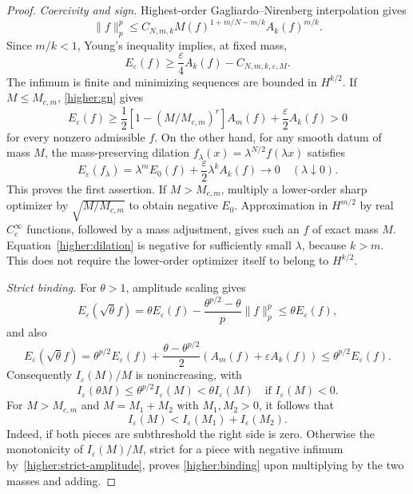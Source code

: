 \begin{proof}
\emph{Coercivity and sign.}
Highest-order Gagliardo--Nirenberg interpolation gives
\begin{equation}\label{higher:coercive-gn}
 \|f\|_p^p\le C_{N,m,k}
 M(f)^{1+m/N-m/k}A_k(f)^{m/k}.
\end{equation}
Since $m/k<1$, Young's inequality implies, at fixed mass,
\begin{equation}\label{higher:coercivity}
 E_\varepsilon(f)\ge\frac\varepsilon4A_k(f)
                         -C_{N,m,k,\varepsilon,M}.
\end{equation}
The infimum is finite and minimizing sequences are bounded in
$H^{k/2}$. If $M\le M_{c,m}$, \eqref{higher:gn} gives
\[
 E_\varepsilon(f)\ge
 \frac12\left[1-(M/M_{c,m})^r\right]A_m(f)
                       +\frac\varepsilon2A_k(f)>0
\]
for every nonzero admissible $f$. On the other hand, for any smooth
datum of mass $M$, the mass-preserving dilation
$f_\lambda(x)=\lambda^{N/2}f(\lambda x)$ satisfies
\begin{equation}\label{higher:dilation}
 E_\varepsilon(f_\lambda)
       =\lambda^mE_0(f)+\frac\varepsilon2\lambda^kA_k(f)
       \longrightarrow0\quad(\lambda\downarrow0).
\end{equation}
This proves the first assertion. If $M>M_{c,m}$, multiply a
lower-order sharp optimizer by $\sqrt{M/M_{c,m}}$ to obtain negative
$E_0$. Approximation in $H^{m/2}$ by real $C_c^\infty$ functions,
followed by a mass adjustment, gives such an $f$ of exact mass $M$.
Equation~\eqref{higher:dilation} is negative for sufficiently small
$\lambda$, because $k>m$. This does not require the lower-order
optimizer itself to belong to $H^{k/2}$.

\emph{Strict binding.}
For $\theta>1$, amplitude scaling gives
\[
 E_\varepsilon(\sqrt\theta f)
 =\theta E_\varepsilon(f)
       -\frac{\theta^{p/2}-\theta}{p}\|f\|_p^p
 \le\theta E_\varepsilon(f),
\]
and also
\[
 E_\varepsilon(\sqrt\theta f)
 =\theta^{p/2}E_\varepsilon(f)
  +\frac{\theta-\theta^{p/2}}2(A_m(f)+\varepsilon A_k(f))
 \le\theta^{p/2}E_\varepsilon(f).
\]
Consequently $I_\varepsilon(M)/M$ is nonincreasing, with
\begin{equation}\label{higher:strict-amplitude}
 I_\varepsilon(\theta M)\le\theta^{p/2}I_\varepsilon(M)
               <\theta I_\varepsilon(M)
 \quad\text{if }I_\varepsilon(M)<0.
\end{equation}
For $M>M_{c,m}$ and $M=M_1+M_2$ with $M_1,M_2>0$, it follows that
\begin{equation}\label{higher:binding}
 I_\varepsilon(M)<I_\varepsilon(M_1)+I_\varepsilon(M_2).
\end{equation}
Indeed, if both pieces are subthreshold the right side is zero.
Otherwise the monotonicity of $I_\varepsilon(M)/M$, strict for a
piece with negative infimum by~\eqref{higher:strict-amplitude}, proves
\eqref{higher:binding} upon multiplying by the two masses and adding.


\end{proof}
